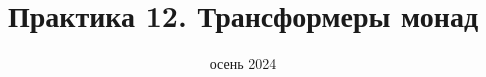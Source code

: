 
\newif\ifhandout




\title[12. Трансформеры монад]{Практика 12. Трансформеры монад}
\date{осень 2024}



    \setcounter{framenumber}{-1}
    \maketitle


